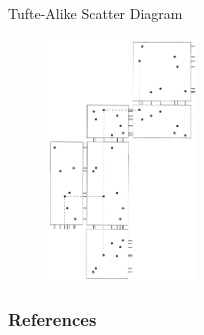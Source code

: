 \documentclass[aspectratio=1610]{beamer}
\begin{document}
\begin{frame}{Tufte-Alike Scatter Diagram}{}
	\begin{figure}
		\begin{center}
			\includegraphics[width=0.35\textwidth]{images/rug_plot.png}
		\end{center}
	\end{figure}

\end{frame}

\begin{frame}
	\frametitle{References}
	\printbibliography
\end{frame}
\end{document}

